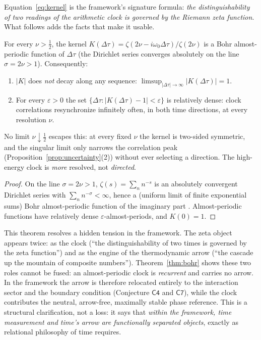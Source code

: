 Equation~\eqref{eq:kernel} is the framework's signature formula: \emph{the
distinguishability of two readings of the arithmetic clock is governed by the Riemann zeta
function}. What follows adds
the facts that make it usable.

\begin{theorem}\label{thm:bohr}
For every $\nu>\tfrac12$, the kernel $K(\Delta\tau)=\zeta(2\nu-i\omega_{0}\Delta\tau)/\zeta(2\nu)$
is a Bohr almost-periodic function of $\Delta\tau$ \cite{besicovitch1932} (the Dirichlet series
converges absolutely on the line $\sigma=2\nu>1$). Consequently:
\begin{enumerate}[leftmargin=1.6em]
\item $|K|$ does \emph{not} decay along any sequence: $\limsup_{|\Delta\tau|\to\infty}|K(\Delta\tau)|=1$.
\item For every $\varepsilon>0$ the set
$\{\Delta\tau:|K(\Delta\tau)-1|<\varepsilon\}$ is relatively dense: clock correlations
resynchronize infinitely often, in both time directions, at every resolution $\nu$.
\end{enumerate}
No limit $\nu\downarrow\tfrac12$ escapes this: at every fixed $\nu$ the kernel is two-sided
symmetric, and the singular limit only narrows the correlation peak
(Proposition~\ref{prop:uncertainty}(2)) without ever selecting a direction. The high-energy
clock is \emph{more} resolved, not \emph{directed}.
\end{theorem}

\begin{proof}
On the line $\sigma=2\nu>1$, $\zeta(s)=\sum_{n}n^{-s}$ is an absolutely convergent Dirichlet
series with $\sum_{n}n^{-\sigma}<\infty$, hence a (uniform limit of finite exponential sums)
Bohr almost-periodic function of the imaginary part \cite{besicovitch1932}. Almost-periodic
functions have relatively dense $\varepsilon$-almost-periods, and $K(0)=1$.
\end{proof}

This theorem resolves a hidden tension in the framework. The zeta
object appears twice: as the clock (``the distinguishability of two times is
governed by the zeta function'') and as the engine of the thermodynamic arrow (``the
cascade up the mountain of composite numbers''). Theorem~\ref{thm:bohr} shows
these two roles cannot be fused: an almost-periodic clock is \emph{recurrent} and carries no
arrow. In the framework the arrow is therefore relocated entirely to the
interaction sector and the boundary condition (Conjecture $\mathsf{C4}$ and $\mathsf{C7}$),
while the clock contributes the neutral, arrow-free, maximally stable phase reference. This
is a structural clarification, not a loss: it says that \emph{within the framework, time
measurement and time's arrow are functionally separated objects}, exactly as relational
philosophy of time requires.

